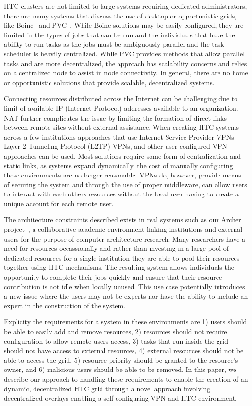 \documentclass{sig-alternate}
\begin{document}
HTC clusters are not limited to large systems requiring dedicated
administrators, there are many systems that discuss the use of desktop or
opportunistic grids, like Boinc~\cite{boinc} and PVC~\cite{pvc}.  While Boinc
solutions may be easily configured, they are limited in the types of jobs that
can be run and the individuals that have the ability to run tasks as the jobs
must be ambiguously parallel and the task scheduler is heavily centralized.
While PVC provides methods that allow parallel tasks and are more
decentralized, the approach has scalability concerns and relies on a centralized
node to assist in node connectivity.  In general, there are no home or
opportunistic solutions that provide scalable, decentralized systems.

Connecting resources distributed across the Internet can be challenging due to
limit of available IP (Internet Protocol) addresses available to an
organization.  NAT further complicates the issue by limiting the formation of
direct links between remote sites without external assistance.  When creating
HTC systems across a few institutions approaches that use Internet Service
Provider VPNs, Layer 2 Tunneling Protocol (L2TP) VPNs, and other
user-configured VPN approaches can be used.  Most solutions require some form
of centralization and static links, as systems expand dynamically, the cost of
manually configuring these environments are no longer reasonable.  VPNs do,
however, provide means of securing the system and through the use of proper
middleware, can allow users to interact with each others resources without
the local user having to create a unique account for each remote user.

The architecture constraints described exists in real systems such as our
Archer project~\cite{archer}, a collaborative academic environment linking
institutions and external users for the purpose of computer architecture
research.  Many researchers have a need for resources occassionally and rather
than investing in a large pool of dedicated resources for a single institution
they are able to pool their resources together using HTC mechanisms.  The
resulting system allows individuals the opportunity to complete their jobs
quickly and ensure that their resource contribution is not idle when locally
unused.  This use case potentially introduces a new issue where the users may
not be experts nor have the ability to include an expert in the construction of
the system.

Explicity the requirements for a system in these environments are 1) users
should be able to easily add and remove resources, 2) resources should not
require configuration to allow remote users access, 3) tasks that run inside
the grid should not have access to external resources, 4) external resources
should not be able to access the grid, 5) resource priority should be granted
to the resource's owner, and 6) malicious users should be able to be removed.
In this paper, we describe our approach to handling these requirements to
enable the creation of an dynamic, decentralized HTC grid through a novel
approach involving decentralized overlays enabling a self-configuring VPN
and HTC environment.  
\end{document}
